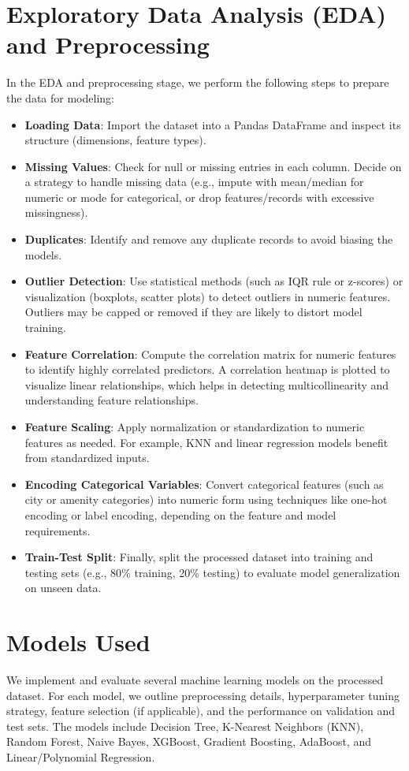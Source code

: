 \documentclass[12pt]{article}
\begin{document}
\section{Exploratory Data Analysis (EDA) and Preprocessing}
In the EDA and preprocessing stage, we perform the following steps to prepare the data for modeling:
\begin{itemize}
    \item \textbf{Loading Data}: Import the dataset into a Pandas DataFrame and inspect its structure (dimensions, feature types).
    \item \textbf{Missing Values}: Check for null or missing entries in each column. Decide on a strategy to handle missing data (e.g., impute with mean/median for numeric or mode for categorical, or drop features/records with excessive missingness).
    \item \textbf{Duplicates}: Identify and remove any duplicate records to avoid biasing the models.
    \item \textbf{Outlier Detection}: Use statistical methods (such as IQR rule or z-scores) or visualization (boxplots, scatter plots) to detect outliers in numeric features. Outliers may be capped or removed if they are likely to distort model training.
    \item \textbf{Feature Correlation}: Compute the correlation matrix for numeric features to identify highly correlated predictors. A correlation heatmap is plotted to visualize linear relationships, which helps in detecting multicollinearity and understanding feature relationships.
    \item \textbf{Feature Scaling}: Apply normalization or standardization to numeric features as needed. For example, KNN and linear regression models benefit from standardized inputs.
    \item \textbf{Encoding Categorical Variables}: Convert categorical features (such as city or amenity categories) into numeric form using techniques like one-hot encoding or label encoding, depending on the feature and model requirements.
    \item \textbf{Train-Test Split}: Finally, split the processed dataset into training and testing sets (e.g., 80\% training, 20\% testing) to evaluate model generalization on unseen data.
\end{itemize}


\section{Models Used}
We implement and evaluate several machine learning models on the processed dataset. For each model, we outline preprocessing details, hyperparameter tuning strategy, feature selection (if applicable), and the performance on validation and test sets. The models include Decision Tree, K-Nearest Neighbors (KNN), Random Forest, Naive Bayes, XGBoost, Gradient Boosting, AdaBoost, and Linear/Polynomial Regression.
\end{document}
